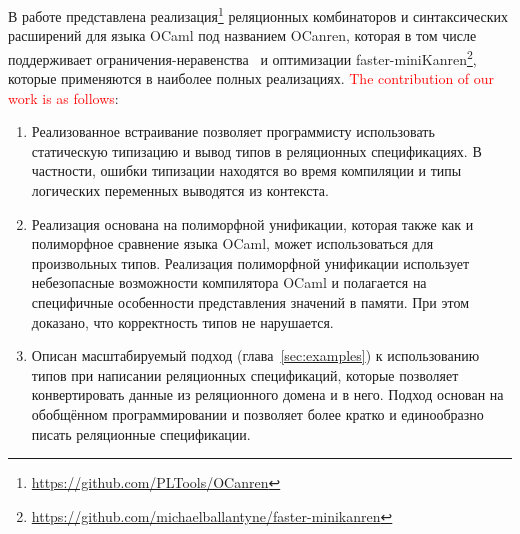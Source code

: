 В работе представлена реализация\footnote{\url{https://github.com/PLTools/OCanren}} реляционных комбинаторов и синтаксических расширений для языка OCaml под названием OCanren,
которая в том числе поддерживает ограничения-неравенства~\cite{CKanren} и  оптимизации faster-miniKanren\footnote{\url{https://github.com/michaelballantyne/faster-minikanren}},
которые применяются в наиболее полных реализациях.
\textcolor{red}{The contribution of our work is as follows}:

\begin{enumerate}
\item Реализованное встраивание позволяет программисту использовать статическую типизацию и вывод типов в реляционных спецификациях. В частности, ошибки типизации находятся во время компиляции и типы логических переменных выводятся из контекста.

\item Реализация основана на полиморфной унификации, которая также как и полиморфное сравнение языка OCaml, может использоваться для произвольных типов.
Реализация полиморфной унификации использует небезопасные возможности компилятора OCaml и полагается на специфичные особенности представления значений в памяти.
При этом доказано, что корректность типов не нарушается.
\item Описан масштабируемый подход (глава~\ref{sec:examples}) к использованию типов при написании реляционных спецификаций, которые позволяет конвертировать данные из реляционного домена и в него. Подход основан на обобщённом программировании и позволяет более кратко и единообразно писать реляционные спецификации.


\end{enumerate}
